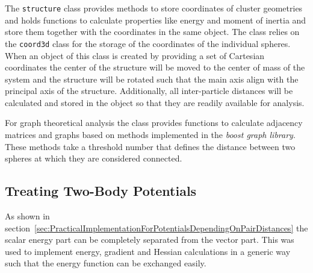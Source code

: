 The \verb|structure| class provides methods to store coordinates of cluster
geometries and holds functions to calculate properties like energy and moment
of inertia and store them together with the coordinates in the same object. The
class relies on the \verb|coord3d| class for the storage of the coordinates of
the individual spheres.  When an object of this class is created by providing a
set of Cartesian coordinates the center of the structure will be moved to the
center of mass of the system and the structure will be rotated such that the
main axis align with the principal axis of the structure. Additionally, all
inter-particle distances will be calculated and stored in the object so that
they are readily available for analysis.

For graph theoretical analysis the class provides functions to calculate
adjacency matrices and graphs based on methods implemented in the \textit{boost
graph library}\autocite{Siek_BoostGraphLibrary_2002}. These methods take a threshold number
that defines the distance between two spheres at which they are considered
connected.

\subsection{Treating Two-Body Potentials}
\label{sec:thepairpotentialclass}

As shown in
section~\ref{sec:PracticalImplementationForPotentialsDependingOnPairDistances}
the scalar energy part can be completely separated from the vector part. This
was used to implement energy, gradient and Hessian calculations in a generic
way such that the energy function can be exchanged easily.

